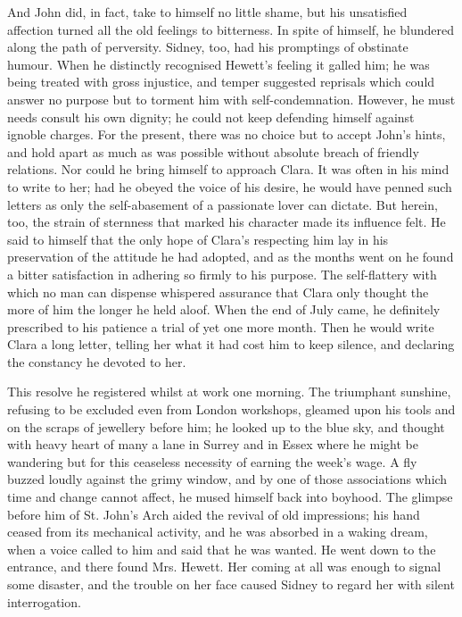 And John did, in fact, take to himself no little shame, but his
unsatisfied affection turned all the old feelings to bitterness. In
spite of himself, he blundered along the path of perversity. Sidney,
too, had his promptings of obstinate humour. When he distinctly
recognised Hewett's feeling it galled him; he was being treated with
gross injustice, and temper suggested reprisals which could answer no
purpose but to torment him with self-condemnation. However, he must
needs consult his own dignity; he could not keep defending himself
against ignoble charges. For the present, there was no choice but to
accept John's hints, and hold apart as much as was {}possible without
absolute breach of friendly relations. Nor could he bring himself to
approach Clara. It was often in his mind to write to her; had he obeyed
the voice of his desire, he would have penned such letters as only the
self-abasement of a passionate lover can dictate. But herein, too, the
strain of sternness that marked his character made its influence felt.
He said to himself that the only hope of Clara's respecting him lay in
his preservation of the attitude he had adopted, and as the months went
on he found a bitter satisfaction in adhering so firmly to his purpose.
The self-flattery with which no man can dispense whispered assurance
that Clara only thought the more of him the longer he held aloof. When
the end of July came, he definitely prescribed to his patience a trial
of yet one more month. Then he would write Clara a long letter, telling
her what it had cost him to keep silence, and declaring the constancy he
devoted to her.

This resolve he registered whilst at work one morning. The triumphant
sunshine, {}refusing to be excluded even from London workshops, gleamed
upon his tools and on the scraps of jewellery before him; he looked up
to the blue sky, and thought with heavy heart of many a lane in Surrey
and in Essex where he might be wandering but for this ceaseless
necessity of earning the week's wage. A fly buzzed loudly against the
grimy window, and by one of those associations which time and change
cannot affect, he mused himself back into boyhood. The glimpse before
him of St. John's Arch aided the revival of old impressions; his hand
ceased from its mechanical activity, and he was absorbed in a waking
dream, when a voice called to him and said that he was wanted. He went
down to the entrance, and there found Mrs. Hewett. Her coming at all was
enough to signal some disaster, and the trouble on her face caused
Sidney to regard her with silent interrogation.

